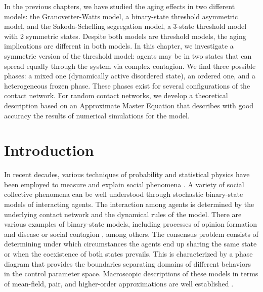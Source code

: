 In the previous chapters, we have studied the aging effects in two different models: the Granovetter-Watts model, a binary-state threshold asymmetric model, and the Sakoda-Schelling segregation model, a 3-state threshold model with 2 symmetric states. Despite both models are threshold models, the aging implications are different in both models. In this chapter, we investigate a symmetric version of the threshold model: agents may be in two states that can spread equally through the system via complex contagion. We find three possible phases: a mixed one (dynamically active disordered state), an ordered one, and a heterogeneous frozen phase. These phases exist for several configurations of the contact network. For random contact networks, we develop a theoretical description based on an Approximate Master Equation that describes with good accuracy the results of numerical simulations for the model.

\section{\label{sec:Introduction} Introduction}

In recent decades, various techniques of probability and statistical physics have been employed to measure and explain social phenomena \cite{castellano2009statistical,jusup2022social,bianconi2023complex}. A variety of social collective phenomena can be well understood through stochastic binary-state models of interacting agents. The interaction among agents is determined by the underlying contact network and the dynamical rules of the model. There are various examples of binary-state models, including processes of opinion formation \cite{Voter-original, sood-2005, Suchecki-2005, fernandez-gracia-2014, redner-2019} and disease or social contagion \cite{granovetter-1978, pastor-satorras-2015}, among others. The consensus problem consists of determining under which circumstances the agents end up sharing the same state or when the coexistence of both states prevails. This is characterized by a phase diagram that provides the boundaries separating domains of different behaviors in the control parameter space. Macroscopic descriptions of these models in terms of mean-field, pair, and higher-order approximations are well established \cite{gleeson-2011}. 
	
